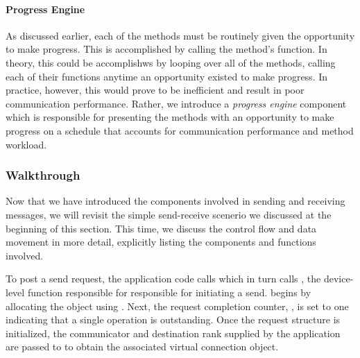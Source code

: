 \paragraph{Progress Engine}


As discussed earlier, each of the methods must be routinely given the
opportunity to make progress.  This is accomplished by calling the method's
 function.  In theory, this could be accomplishws by looping over
all of the methods, calling each of their  functions anytime an
opportunity existed to make progress.  In practice, however, this would prove
to be inefficient and result in poor communication performance.  Rather, we
introduce a \emph{progress engine} component which is responsible for
presenting the methods with an opportunity to make progress on a schedule that
accounts for communication performance and method workload.



\subsubsection{Walkthrough}
\label{sssec:walkthrough}


Now that we have introduced the components involved in sending and receiving
messages, we will revisit the simple send-receive scenerio we discussed at the
beginning of this section.  This time, we discuss the control flow and data
movement in more detail, explicitly listing the components and functions
involved.


To post a send request, the application code calls  which in
turn calls , the device-level function responsible for
responsible for initiating a send.   begins by allocating the
 object using .  Next, the
request completion counter, , is set to one indicating
that a single operation is outstanding.  Once the request structure is
initialized, the communicator and destination rank supplied by the application
are passed to  to obtain the associated virtual
connection object.

